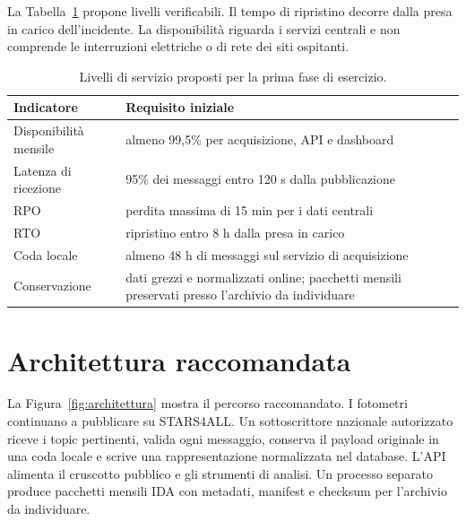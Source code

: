 \documentclass[11pt,a4paper]{report}
\begin{document}
La Tabella~\ref{tab:servizio} propone livelli verificabili. Il tempo di ripristino decorre dalla presa in carico dell'incidente. La disponibilità riguarda i servizi centrali e non comprende le interruzioni elettriche o di rete dei siti ospitanti.

\begin{table}[ht!]
\centering
\renewcommand{\arraystretch}{1.5}
\small

\begin{tabularx}{\linewidth}{@{}l X@{}}
\toprule
Indicatore & Requisito iniziale \\
\midrule
Disponibilità mensile & almeno 99,5\% per acquisizione, API e dashboard \\
Latenza di ricezione & 95\% dei messaggi entro 120 s dalla pubblicazione \\
RPO & perdita massima di 15 min per i dati centrali \\
RTO & ripristino entro 8 h dalla presa in carico \\
Coda locale & almeno 48 h di messaggi sul servizio di acquisizione \\
Conservazione & dati grezzi e normalizzati online; pacchetti mensili preservati presso l'archivio da individuare \\
\bottomrule
\end{tabularx}

\caption{Livelli di servizio proposti per la prima fase di esercizio.}
\label{tab:servizio}
\end{table}

\FloatBarrier

\section*{Architettura raccomandata}

La Figura~\ref{fig:architettura} mostra il percorso raccomandato. I fotometri continuano a pubblicare su STARS4ALL. Un sottoscrittore nazionale autorizzato riceve i topic pertinenti, valida ogni messaggio, conserva il payload originale in una coda locale e scrive una rappresentazione normalizzata nel database. L'API alimenta il cruscotto pubblico e gli strumenti di analisi. Un processo separato produce pacchetti mensili IDA con metadati, manifest e checksum per l'archivio da individuare.
\end{document}
